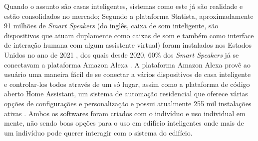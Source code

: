 Quando o assunto são casas inteligentes, sistemas como este já são realidade e estão consolidados no mercado; Segundo a plataforma
Statista, aproximadamente 91 milhões de \emph{Smart Speakers} {(}do inglês, caixa de som inteligente, são dispositivos que atuam 
duplamente como caixas de som e também como interface de interação humana com algum assistente virtual{)} foram instalados nos 
Estados Unidos no ano de 2021 \cite{statista1}, dos quais desde 2020, 60\% dos \emph{Smart Speakers} já se conectavam a plataforma
Amazon Alexa \cite{statista2}. A plataforma Amazon Alexa provê ao usuário uma maneira fácil de se conectar a vários dispositivos de
casa inteligente e controlar-los todos através de um só lugar, assim como a plataforma de código aberto Home Assistant, um sistema de
automação residencial \cite{assistant_home_nodate} que oferece várias opções de configurações e personalização e possui atualmente
255 mil instalações ativas \cite{home_assistant1}. Ambos os softwares foram criados com o indivíduo e uso individual em mente, não sendo
boas opções para o uso em edifício inteligentes onde mais de um indivíduo pode querer interagir com o sistema do edifício.

